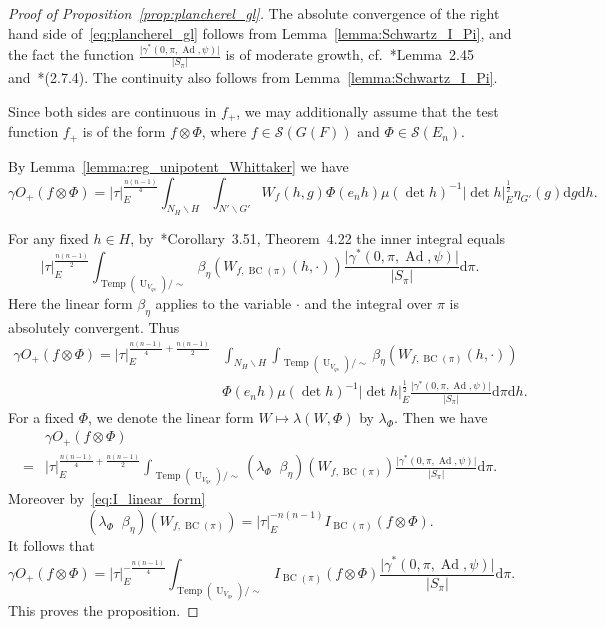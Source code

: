 \documentclass[letterpaper,11pt]{amsart}
\newcommand{\cS}{\mathcal{S}}
\newcommand{\rd}{\mathrm{d}}
\newcommand{\bs}{\backslash}
\newcommand{\<}{\negthickspace}
\providecommand{\abs}[1]{\lvert#1\rvert}
\DeclareMathOperator{\U}{U}
\DeclareMathOperator{\BC}{BC}
\DeclareMathOperator{\Ad}{Ad}
\DeclareMathOperator{\Temp}{Temp} \DeclareMathOperator{\temp}{temp}
\DeclareMathOperator{\otimeshat}{\widehat{\otimes}}
\theoremstyle{definition}
\theoremstyle{plain}
\theoremstyle{remark}
\numberwithin{equation}{section}
\begin{document}
\begin{proof}[Proof of Proposition~\ref{prop:plancherel_gl}]
The absolute convergence of the right hand side of~\eqref{eq:plancherel_gl}
follows from Lemma~\ref{lemma:Schwartz_I_Pi}, and the fact the function
$\frac{\abs{\gamma^*(0, \pi, \Ad, \psi)}}{\abs{S_{\pi}}}$ is of moderate
growth, cf.~\cite{BP1}*{Lemma~2.45} and~\cite{BP1}*{(2.7.4)}. The continuity
also follows from Lemma~\ref{lemma:Schwartz_I_Pi}.

Since both sides are continuous in $f_+$, we may additionally assume that the
test function $f_+$ is of the form $f \otimes \Phi$, where $f \in \cS(G(F))$ and
$\Phi \in \cS(E_n)$.

By Lemma~\ref{lemma:reg_unipotent_Whittaker} we have
    \[
    \gamma O_+(f \otimes \Phi)
     = \abs{\tau}_E^{\frac{n(n-1)}{4}}
    \int_{N_H \bs H}
    \int_{N' \bs G'} W_{f}(h, g) \Phi(e_n h) \mu(\det h)^{-1}
    \abs{\det h}_E^{\frac{1}{2}} \eta_{G'}(g) \rd g \rd h.
    \]


For any fixed $h \in H$, by~\cite{BP1}*{Corollary~3.51, Theorem~4.22} the
inner integral equals
    \[
    \abs{\tau}_E^{\frac{n(n-1)}{2}}
    \int_{\Temp(\U_{V_{qs}})/\sim} \beta_{\eta}(W_{f, \BC(\pi)}(h, \cdot))
    \frac{\abs{\gamma^*(0, \pi, \Ad, \psi)}}{\abs{S_{\pi}}} \rd \pi.
    \]
Here the linear form $\beta_{\eta}$ applies to the variable $\cdot$ and the integral
over $\pi$ is absolutely convergent. Thus
    \[
    \begin{aligned}
    \gamma O_+(f \otimes \Phi) =
    \abs{\tau}_E^{\frac{n(n-1)}{4}+\frac{n(n-1)}{2}}
    &\int_{N_H \bs H}
    \int_{\Temp(\U_{V_{qs}})/\sim} \beta_{\eta}(W_{f, \BC(\pi)}(h, \cdot))\\
    &\Phi(e_n h) \mu(\det h)^{-1}
    \abs{\det h}_E^{\frac{1}{2}}
    \frac{\abs{\gamma^*(0, \pi, \Ad, \psi)}}{\abs{S_{\pi}}} \rd \pi \rd h.
    \end{aligned}
    \]
For a fixed $\Phi$, we denote the linear form $W \mapsto \lambda(W, \Phi)$ by
$\lambda_\Phi$. Then we have
    \[
    \begin{aligned}
    &\gamma O_+(f \otimes \Phi)\\ =
    &\abs{\tau}_E^{\frac{n(n-1)}{4}+\frac{n(n-1)}{2}}
    \int_{\Temp(\U_{V_{qs}})/\sim}
    (\lambda_{\Phi} \otimeshat \beta_{\eta})\left(W_{f, \BC(\pi)}\right)
    \frac{\abs{\gamma^*(0, \pi, \Ad, \psi)}}{\abs{S_{\pi}}} \rd \pi.
    \end{aligned}
    \]
Moreover by~\eqref{eq:I_linear_form}
    \[
    (\lambda_{\Phi} \otimeshat \beta_{\eta})\left(W_{f, \BC(\pi)}\right) =
    \abs{\tau}_E^{-n(n-1)} I_{\BC(\pi)}(f \otimes \Phi).
    \]
It follows that
    \[
    \gamma O_+(f \otimes \Phi) = \abs{\tau}_E^{-\frac{n(n-1)}{4}}
    \int_{\Temp(\U_{V_{qs}})/\sim} I_{\BC(\pi)}(f \otimes \Phi)
    \frac{\abs{\gamma^*(0,\pi, \Ad, \psi)}}{\abs{S_{\pi}}} \rd \pi.
    \]
This proves the proposition.
\end{proof}
\end{document}
